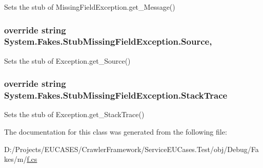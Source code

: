 Sets the stub of Missing\-Field\-Exception.\-get\-\_\-\-Message()

\hypertarget{class_system_1_1_fakes_1_1_stub_missing_field_exception_a2bdfedfa53df4a16e8d9d125276905ad}{
\subsubsection[{Source}]{\setlength{\rightskip}{0pt plus 5cm}override string System.\-Fakes.\-Stub\-Missing\-Field\-Exception.\-Source\hspace{0.3cm}{\ttfamily [get]}, {\ttfamily [set]}}}\label{class_system_1_1_fakes_1_1_stub_missing_field_exception_a2bdfedfa53df4a16e8d9d125276905ad}


Sets the stub of Exception.\-get\-\_\-\-Source()

\hypertarget{class_system_1_1_fakes_1_1_stub_missing_field_exception_ab85c3bedc96ed14c187b3a599b74ecaf}{
\subsubsection[{Stack\-Trace}]{\setlength{\rightskip}{0pt plus 5cm}override string System.\-Fakes.\-Stub\-Missing\-Field\-Exception.\-Stack\-Trace\hspace{0.3cm}{\ttfamily [get]}}}\label{class_system_1_1_fakes_1_1_stub_missing_field_exception_ab85c3bedc96ed14c187b3a599b74ecaf}


Sets the stub of Exception.\-get\-\_\-\-Stack\-Trace()



The documentation for this class was generated from the following file\-:\begin{DoxyCompactItemize}
\item 
D\-:/\-Projects/\-E\-U\-C\-A\-S\-E\-S/\-Crawler\-Framework/\-Service\-E\-U\-Cases.\-Test/obj/\-Debug/\-Fakes/m/\hyperlink{m_2f_8cs}{f.\-cs}\end{DoxyCompactItemize}
